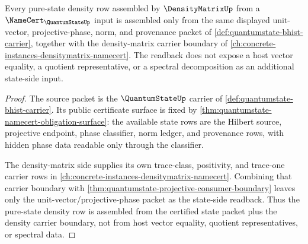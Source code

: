 \begin{theorem}
\label{thm:quantumstate-densitymatrix-pure-state-readback}
Every pure-state density row assembled by $\DensityMatrixUp$ from a
$\NameCert_{\QuantumStateUp}$ input is assembled only from the same displayed
unit-vector, projective-phase, norm, and provenance packet of
\autoref{def:quantumstate-bhist-carrier}, together with the density-matrix
carrier boundary of \autoref{ch:concrete-instances-densitymatrix-namecert}.
The readback does not expose a host vector equality, a quotient representative,
or a spectral decomposition as an additional state-side input.
\end{theorem}
\begin{proof}
The source packet is the $\QuantumStateUp$ carrier of
\autoref{def:quantumstate-bhist-carrier}. Its public certificate surface is
fixed by \autoref{thm:quantumstate-namecert-obligation-surface}: the available
state rows are the Hilbert source, projective endpoint, phase classifier, norm
ledger, and provenance rows, with hidden phase data readable only through the
classifier.

The density-matrix side supplies its own trace-class, positivity, and
trace-one carrier rows in
\autoref{ch:concrete-instances-densitymatrix-namecert}. Combining that carrier
boundary with \autoref{thm:quantumstate-projective-consumer-boundary} leaves
only the unit-vector/projective-phase packet as the state-side readback. Thus
the pure-state density row is assembled from the certified state packet plus
the density carrier boundary, not from host vector equality, quotient
representatives, or spectral data.
\end{proof}

